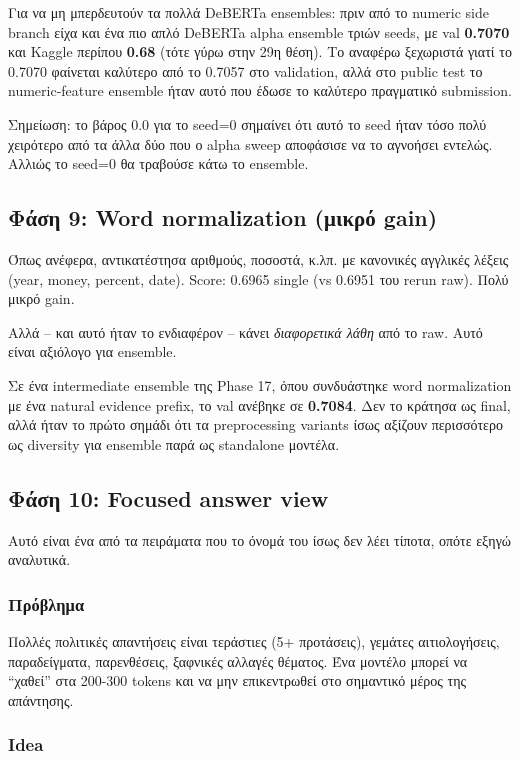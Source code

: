 \documentclass[12pt]{fphw}
\begin{document}
Για να μη μπερδευτούν τα πολλά DeBERTa ensembles: πριν από το numeric side branch είχα και ένα πιο απλό DeBERTa alpha ensemble τριών seeds, με val \textbf{0.7070} και Kaggle περίπου \textbf{0.68} (τότε γύρω στην 29η θέση). Το αναφέρω ξεχωριστά γιατί το 0.7070 φαίνεται καλύτερο από το 0.7057 στο validation, αλλά στο public test το numeric-feature ensemble ήταν αυτό που έδωσε το καλύτερο πραγματικό submission.

Σημείωση: το βάρος 0.0 για το seed=0 σημαίνει ότι αυτό το seed ήταν τόσο πολύ χειρότερο από τα άλλα δύο που ο alpha sweep αποφάσισε να το αγνοήσει εντελώς. Αλλιώς το seed=0 θα τραβούσε κάτω το ensemble.

\subsection{Φάση 9: Word normalization (μικρό gain)}

Όπως ανέφερα, αντικατέστησα αριθμούς, ποσοστά, κ.λπ. με κανονικές αγγλικές λέξεις (year, money, percent, date). Score: 0.6965 single (vs 0.6951 του rerun raw). Πολύ μικρό gain.

Αλλά -- και αυτό ήταν το ενδιαφέρον -- κάνει \emph{διαφορετικά λάθη} από το raw. Αυτό είναι αξιόλογο για ensemble.

Σε ένα intermediate ensemble της Phase 17, όπου συνδυάστηκε word normalization με ένα natural evidence prefix, το val ανέβηκε σε \textbf{0.7084}. Δεν το κράτησα ως final, αλλά ήταν το πρώτο σημάδι ότι τα preprocessing variants ίσως αξίζουν περισσότερο ως diversity για ensemble παρά ως standalone μοντέλα.

\subsection{Φάση 10: Focused answer view}

Αυτό είναι ένα από τα πειράματα που το όνομά του ίσως δεν λέει τίποτα, οπότε εξηγώ αναλυτικά.

\subsubsection{Πρόβλημα}

Πολλές πολιτικές απαντήσεις είναι τεράστιες (5+ προτάσεις), γεμάτες αιτιολογήσεις, παραδείγματα, παρενθέσεις, ξαφνικές αλλαγές θέματος. Ένα μοντέλο μπορεί να ``χαθεί'' στα 200-300 tokens και να μην επικεντρωθεί στο σημαντικό μέρος της απάντησης.

\subsubsection{Idea}
\end{document}
